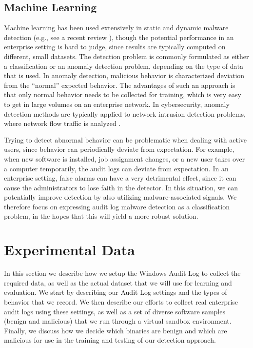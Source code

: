 \documentclass{sig-alternate-2013}
\newcommand{\eg}{e.g.\xspace}
\begin{document}
\subsection{Machine Learning}

Machine learning has been used extensively in static and dynamic malware detection (\eg, see a recent review \cite{gandotra2014malware}), though the potential performance in an enterprise setting is hard to judge, since results are typically computed on different, small datasets. The detection problem is commonly formulated as either a classification or an anomaly detection problem, depending on the type of data that is used. In anomaly detection, malicious behavior is characterized deviation from the ``normal'' expected behavior. The advantages of such an approach is that only normal behavior needs to be collected for training, which is very easy to get in large volumes on an enterprise network. In cybersecurity, anomaly detection methods are typically applied to network intrusion detection problems, where network flow traffic is analyzed \cite{yen2013beehive}.  

Trying to detect abnormal behavior can be problematic when dealing with active users, since behavior can periodically deviate from expectation. For example, when new software is installed, job assignment changes, or a new user takes over a computer temporarily, the audit logs can deviate from expectation. In an enterprise setting, false alarms can have a very detrimental effect, since it can cause the administrators to lose faith in the detector. In this situation, we can potentially improve detection by also utilizing malware-associated signals. We therefore focus on expressing audit log malware detection as a classification problem, in the hopes that this will yield a more robust solution. 

\section{Experimental Data}
\label{sec:experimental}

In this section we describe how we setup the Windows Audit Log to collect the required data, as well as the actual dataset that we will use for learning and evaluation. We start by describing our Audit Log settings and the types of behavior that we record. We then describe our efforts to collect real enterprise audit logs using these settings, as well as a set of diverse software samples (benign and malicious) that we run through a virtual sandbox environment. Finally, we discuss how we decide which binaries are benign and which are malicious for use in the training and testing of our detection approach.
\end{document}
